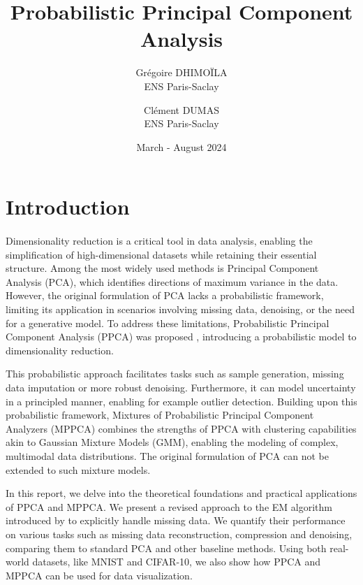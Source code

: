 \documentclass{article}
\begin{document}
\title{Probabilistic Principal Component Analysis}
\author{Grégoire DHIMOÏLA \\ ENS Paris-Saclay \and Clément DUMAS \\ ENS Paris-Saclay}
\date{March - August 2024}
\maketitle

\section{Introduction}
\label{sec:introduction}

\paragraph{} Dimensionality reduction is a critical tool in data analysis, enabling the simplification of high-dimensional datasets while retaining their essential structure. Among the most widely used methods is Principal Component Analysis (PCA), which identifies directions of maximum variance in the data. However, the original formulation of PCA lacks a probabilistic framework, limiting its application in scenarios involving missing data, denoising, or the need for a generative model. To address these limitations, Probabilistic Principal Component Analysis (PPCA) was proposed \citep{PPCA}, introducing a probabilistic model to dimensionality reduction.

This probabilistic approach facilitates tasks such as sample generation, missing data imputation or more robust denoising. Furthermore, it can model uncertainty in a principled manner, enabling for example outlier detection. Building upon this probabilistic framework, Mixtures of Probabilistic Principal Component Analyzers (MPPCA) \citep{MPPCA} combines the strengths of PPCA with clustering capabilities akin to Gaussian Mixture Models (GMM), enabling the modeling of complex, multimodal data distributions. The original formulation of PCA can not be extended to such mixture models.

In this report, we delve into the theoretical foundations and practical applications of PPCA and MPPCA. We present a revised approach to the EM algorithm introduced by \citet{PPCA} to explicitly handle missing data. We quantify their performance on various tasks such as missing data reconstruction, compression and denoising, comparing them to standard PCA and other baseline methods. Using both real-world datasets, like MNIST and CIFAR-10, we also show how PPCA and MPPCA can be used for data visualization.
\end{document}
